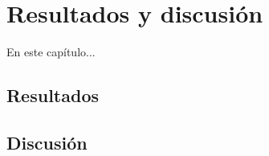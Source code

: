 \chapter{Resultados y discusión}

En este capítulo...


\section{Resultados}
\begin{figure}
\end{figure}


\section{Discusión}